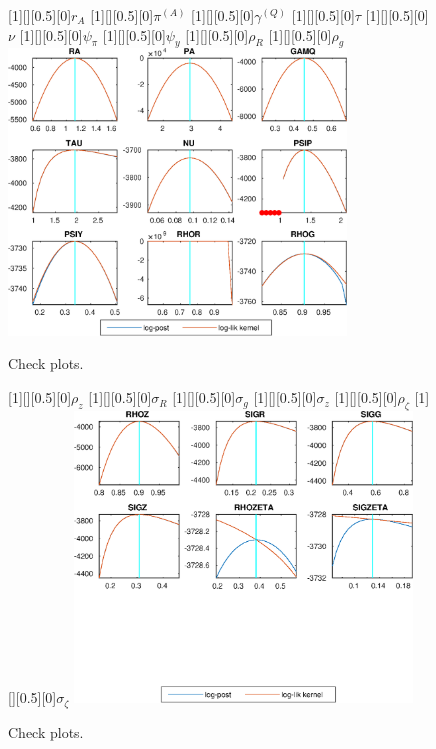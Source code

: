  
\begin{figure}[H]
[1][][0.5][0]{$ {r_{A}} $}
[1][][0.5][0]{$ {\pi^{(A)}} $}
[1][][0.5][0]{$ {\gamma^{(Q)}} $}
[1][][0.5][0]{$ {\tau} $}
[1][][0.5][0]{$ {\nu} $}
[1][][0.5][0]{$ {\psi_\pi} $}
[1][][0.5][0]{$ {\psi_y} $}
[1][][0.5][0]{$ {\rho_R} $}
[1][][0.5][0]{$ {\rho_{g}} $}
\centering 
\includegraphics[width=0.80\textwidth]{AnSchoModTheBuilder_CheckPlots1}
\caption{Check plots.}\label{Fig:CheckPlots:1}
\end{figure}
 
\begin{figure}[H]
[1][][0.5][0]{$ {\rho_z} $}
[1][][0.5][0]{$ {\sigma_R} $}
[1][][0.5][0]{$ {\sigma_{g}} $}
[1][][0.5][0]{$ {\sigma_z} $}
[1][][0.5][0]{$ {\rho_\zeta} $}
[1][][0.5][0]{$ {\sigma_\zeta} $}
\centering 
\includegraphics[width=0.80\textwidth]{AnSchoModTheBuilder_CheckPlots2}
\caption{Check plots.}\label{Fig:CheckPlots:2}
\end{figure}
 
